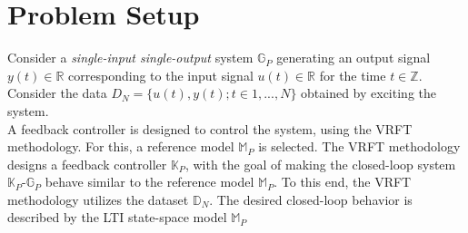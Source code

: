 \documentclass[letterpaper, 10 pt, conference]{ieeeconf}  %
\begin{document}
\section{Problem Setup}
Consider a \textit{single-input single-output} system $\mathbb{G}_P$ generating an output signal $y(t) \in \mathbb{R}$ corresponding to the input signal $u(t) \in \mathbb{R}$ for the time $t \in \mathbb{Z}$. Consider the data $D_{N}=\{u(t),y(t);t\in{1,...,N}\}$ obtained by exciting the system. 
\\
A feedback controller is designed to control the system, using the VRFT methodology. For this, a reference model $\mathbb{M}_P$ is selected. The VRFT methodology designs a feedback controller  $\mathbb{K}_P$, with the goal of making the closed-loop system $\mathbb{K}_P$-$\mathbb{G}_P$ behave similar to the reference model $\mathbb{M}_P$. To this end, the VRFT methodology utilizes the dataset $\mathbb{D}_N$. The desired closed-loop behavior is described by the LTI state-space model $\mathbb{M}_P$ 
\end{document}

